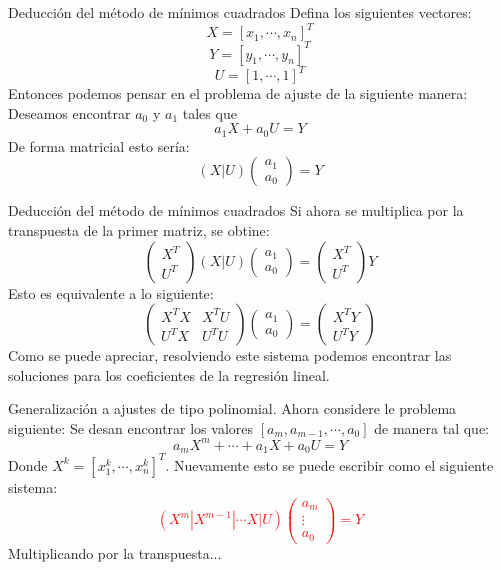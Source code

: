 \documentclass[10pt,legalpaper]{beamer}
\begin{document}
\begin{frame}{Deducción del método de mínimos cuadrados}
Defina los siguientes vectores:
$$X=[x_1,\cdots,x_n]^T$$
$$Y=[y_1,\cdots,y_n]^T$$
$$U=[1,\cdots,1]^T$$
Entonces podemos pensar en el problema de ajuste de la siguiente manera: Deseamos encontrar $a_0$ y $a_1$ tales que
$$a_1X+a_0U=Y$$
De forma matricial esto sería:
\begin{displaymath}
(X|U)
\left(
\begin{array}{c}
a_1\\
a_0
\end{array}
\right)=Y
\end{displaymath}
\end{frame}
\begin{frame}{Deducción del método de mínimos cuadrados}
Si ahora se multiplica por la transpuesta de la primer matriz, se obtine:
\begin{displaymath}
\left(
\begin{array}{c}
X^T\\
U^T
\end{array}
\right)
(X|U)
\left(
\begin{array}{c}
a_1\\
a_0
\end{array}
\right)=
\left(
\begin{array}{c}
X^T\\
U^T
\end{array}
\right)
Y
\end{displaymath}
Esto es equivalente a lo siguiente:
\begin{displaymath}
\left(
\begin{array}{cc}
X^TX &X^TU\\
U^TX & U^TU
\end{array}
\right)
\left(
\begin{array}{c}
a_1\\
a_0
\end{array}
\right)=
\left(
\begin{array}{c}
X^TY\\
U^TY
\end{array}
\right)
\end{displaymath}
Como se puede apreciar, resolviendo este sistema podemos encontrar las soluciones para los coeficientes de la regresión lineal.
\end{frame}
\begin{frame}{Generalización a ajustes de tipo polinomial.}
Ahora considere le problema siguiente: Se desan encontrar los valores $[a_m,a_{m-1},\cdots,a_0]$ de manera tal que:
$$a_mX^m+\cdots+a_1X+a_0U=Y$$
Donde $X^k=[x_1^k,\cdots,x_n^k]^T$. Nuevamente esto se puede escribir como el siguiente sistema:
\textcolor{red}{
\begin{displaymath}
(X^m|X^{m-1}|\cdots X|U)
\left(
\begin{array}{c}
a_m\\
\vdots\\
a_0
\end{array}
\right)=Y
\end{displaymath}
}
Multiplicando por la transpuesta...
\end{frame}
\end{document}
